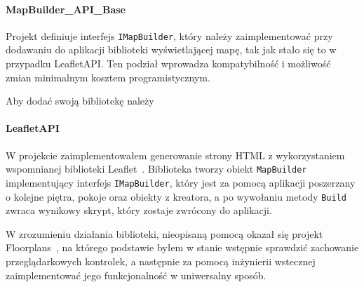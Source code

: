 \paragraph{MapBuilder\_API\_Base}
Projekt definiuje interfejs \verb|IMapBuilder|, który należy zaimplementować przy dodawaniu 
do aplikacji biblioteki wyświetlającej mapę, tak jak stało się to w przypadku LeafletAPI.
Ten podział wprowadza kompatybilność i możliwość zmian minimalnym kosztem programistycznym.

Aby dodać swoją bibliotekę należy 

\paragraph{LeafletAPI}
W projekcie zaimplementowałem generowanie strony HTML z wykorzystaniem wspomnianej biblioteki Leaflet~\cite{leafletGithub}.
Biblioteka tworzy obiekt \verb|MapBuilder| implementujący interfejs \verb|IMapBuilder|, który jest 
za pomocą aplikacji poszerzany o kolejne piętra, pokoje oraz obiekty z kreatora, a po wywołaniu 
metody \verb|Build| zwraca wynikowy skrypt, który zostaje zwrócony do aplikacji.

W zrozumieniu działania biblioteki, nieopisaną pomocą okazał się projekt Floorplans~\cite{floorplansGithub},
na którego podstawie byłem w stanie wstępnie sprawdzić zachowanie przeglądarkowych kontrolek, 
a następnie za pomocą inżynierii wstecznej zaimplementować jego funkcjonalność w uniwersalny sposób.


